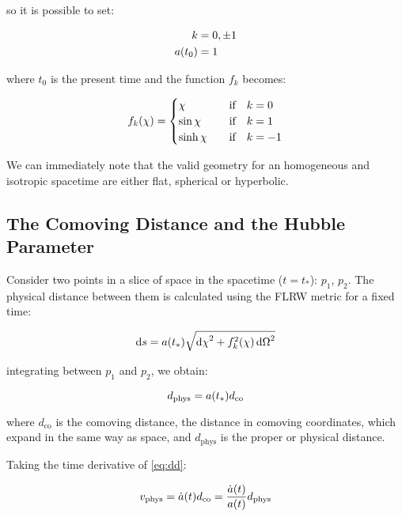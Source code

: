 so it is possible to set:

\begin{align}
k & = 0,\pm 1 \\
a\qty(t_0) & = 1
\end{align}

where $t_0$ is the present time and the function $f_k$ becomes: 

        \begin{equation}
                f_k\qty(\chi) =
                        \begin{cases}
                                 \chi & \qif k = 0 \\
                                 \sin \chi & \qif k = 1 \\
                                 \sinh \chi & \qif k = -1 
                        \end{cases}
        \end{equation}

We can immediately note that the valid geometry for an homogeneous
and isotropic spacetime are either flat, spherical or hyperbolic.

\subsection{The Comoving Distance and the Hubble Parameter}

Consider two points in a slice of space in the spacetime ($t = t_*$): $p_1$,
$p_2$. The physical distance between them is calculated using the FLRW
metric for a fixed time:

\begin{equation}
        \dd{s} = a\qty(t_*)\sqrt{\dd{\chi}^2 +
        f_k^2\qty(\chi)\dd{\Omega}^2}
\end{equation}

integrating between $p_1$ and $p_2$, we obtain:

\begin{equation}
        d_{\text{phys}} = a\qty(t_*)d_{\text{co}}
        \label{eq:dd}
\end{equation}

where $d_{\text{co}}$ is the comoving distance, the distance in comoving
coordinates, which expand in the same way as space, and $d_\text{phys}$ is
the proper or physical distance.

Taking the time derivative of \autoref{eq:dd}:

\begin{equation}
        v_{\text{phys}} = \dot a\qty(t) d_{\text{co}} = \frac{\dot a\qty(t)}{a\qty(t)} d_{\text{phys}}
\end{equation}

